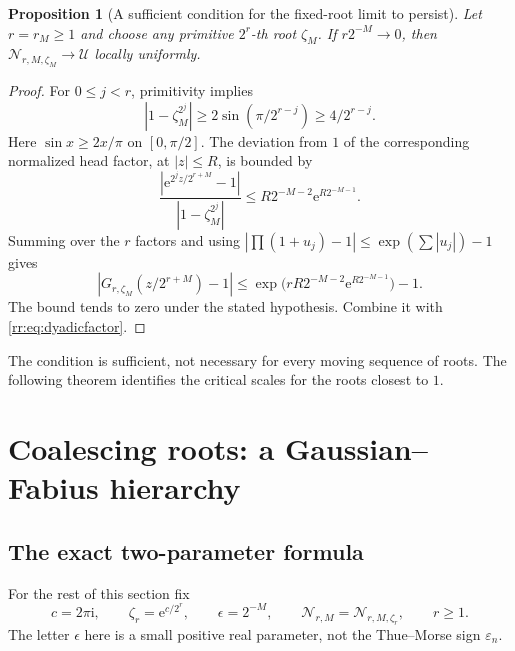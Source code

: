 \documentclass[11pt,a4paper,oneside,openany]{book}
\numberwithin{equation}{chapter}
\newtheorem{proposition}[theorem]{Proposition}
\theoremstyle{definition}
\theoremstyle{remark}
\newcommand{\eps}{\varepsilon}
\newcommand{\e}{\mathrm e}
\newcommand{\ii}{\mathrm i}
\newcommand{\Up}{\mathcal U}
\newcommand{\Np}{\mathcal N}
\begin{document}
\begin{proposition}[A sufficient condition for the fixed-root limit to persist]
Let \(r=r_M\geq1\) and choose any primitive \(2^r\)-th root \(\zeta_M\). If \(r2^{-M}\to0\), then
\(\Np_{r,M,\zeta_M}\to\Up\) locally uniformly.
\end{proposition}
\begin{proof}
For \(0\leq j<r\), primitivity implies
\[
 |1-\zeta_M^{2^j}|\geq2\sin(\pi/2^{r-j})\geq 4/2^{r-j}.
\]
Here \(\sin x\geq2x/\pi\) on \([0,\pi/2]\). The deviation from \(1\) of the corresponding normalized head factor, at \(|z|\leq R\), is bounded by
\[
 \frac{|\e^{2^jz/2^{r+M}}-1|}{|1-\zeta_M^{2^j}|}
 \leq R2^{-M-2}\e^{R2^{-M-1}}.
\]
Summing over the \(r\) factors and using
\(|\prod(1+u_j)-1|\leq\exp(\sum|u_j|)-1\) gives
\begin{equation}
 \left|G_{r,\zeta_M}(z/2^{r+M})-1\right|
 \leq\exp\bigl(rR2^{-M-2}\e^{R2^{-M-1}}\bigr)-1.
 \label{rr:eq:uniformhead}
\end{equation}
The bound tends to zero under the stated hypothesis. Combine it with \eqref{rr:eq:dyadicfactor}.
\end{proof}
The condition is sufficient, not necessary for every moving sequence of roots. The following theorem identifies the critical scales for the roots closest to \(1\).
\chapter{Coalescing roots: a Gaussian--Fabius hierarchy}
\label{rr:sec:coalescing}

\section{The exact two-parameter formula}
For the rest of this section fix
\begin{equation}
 c=2\pi\ii,\qquad \zeta_r=\e^{c/2^r},\qquad
 \epsilon=2^{-M},\qquad
 \Np_{r,M}=\Np_{r,M,\zeta_r},\qquad r\geq1.
 \label{rr:eq:coalescingsetup}
\end{equation}
The letter \(\epsilon\) here is a small positive real parameter, not the Thue--Morse sign \(\eps_n\).
\end{document}
